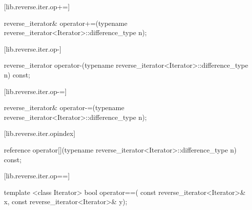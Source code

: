 [lib.reverse.iter.op+=]{}

%
\begin{itemdecl}
reverse_iterator&
operator+=(typename reverse_iterator<Iterator>::difference_type n);
\end{itemdecl}

\begin{itemdescr}
\pnum
\effects
{}

\pnum
\returns
{}
\end{itemdescr}

[lib.reverse.iter.op-]{}

%
\begin{itemdecl}
reverse_iterator
operator-(typename reverse_iterator<Iterator>::difference_type n) const;
\end{itemdecl}

\begin{itemdescr}
\pnum
\returns
{}
\end{itemdescr}

[lib.reverse.iter.op-=]{}

%
\begin{itemdecl}
reverse_iterator&
operator-=(typename reverse_iterator<Iterator>::difference_type n);
\end{itemdecl}

\begin{itemdescr}
\pnum
\effects
{}

\pnum
\returns
{}
\end{itemdescr}

[lib.reverse.iter.opindex]{}

%
\begin{itemdecl}
reference
operator[](typename reverse_iterator<Iterator>::difference_type n) const;
\end{itemdecl}

\begin{itemdescr}
\pnum
\returns
{}
\end{itemdescr}

[lib.reverse.iter.op==]{}

%
\begin{itemdecl}
template <class Iterator>
  bool operator==(
    const reverse_iterator<Iterator>& x,
    const reverse_iterator<Iterator>& y);
\end{itemdecl}

